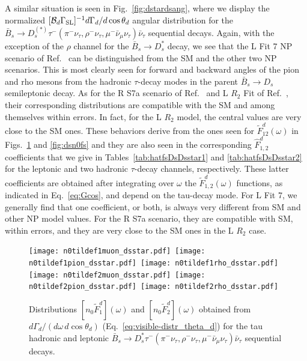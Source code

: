 \documentclass[aps,superscriptaddress,showpacs,nofootinbib,11pt]{revtex4-1}
\begin{document}
A similar situation is seen in Fig.~\ref{fig:dstardsang}, where we display the normalized $[{\cal B}_d\Gamma_{\rm SL}]^{-1}d\Gamma_d/d\cos\theta_d$ angular distribution for the 
$\bar B_s\to D_s^{(*)}\tau^-(\pi^-\nu_\tau,\rho^-\nu_\tau,\mu^-\bar\nu_\mu\nu_\tau)\bar\nu_\tau$ sequential decays. Again, with the exception of the $\rho$ channel for the $
\bar B_s\to D_s^*$ decay, we see that the  L Fit 7 NP scenario of Ref.~\cite{Murgui:2019czp} can be distinguished from the SM and the other two NP scenarios. This is most clearly seen for forward and backward angles of the pion and rho mesons from the hadronic $\tau$-decay modes in the 
parent $\bar B_s\to D_s$ semileptonic decay. As for the R S7a scenario of Ref.~\cite{Mandal:2020htr} and L $R_2$ Fit of
Ref.~\cite{Shi:2019gxi}, their corresponding distributions are compatible with the SM and among themselves within errors. In fact, for the L $R_2$ model, the central values are very close to the SM ones. 
These behaviors derive from the ones seen for $\widetilde F^d_{12}(\omega)$ in Figs.~\ref{fig:dsstardsn0fs} and \ref{fig:dsn0fs} and they are also seen in  
the corresponding $\widehat F^d_{1,2}$ coefficients  that we give in Tables~\ref{tab:hatfsDsDsstar1} and \ref{tab:hatfsDsDsstar2} for the leptonic and two hadronic $\tau$-decay channels, respectively. These latter coefficients are obtained after integrating over $\omega$ the $\widetilde F^d_{1,2}(\omega)$ functions, as indicated in Eq.~\eqref{eq:Gcos}, and depend on the tau-decay mode.
For L Fit 7, we generally find that one coefficient, or both, is always very different from SM and other NP model values. For the R S7a scenario, they are compatible with SM, within errors, and  they are very close to the SM ones in the L $R_2$ case.
\begin{figure}
\begin{center}
\texttt{[image: n0tildef1muon\_dsstar.pdf]}\
\texttt{[image: n0tildef1pion\_dsstar.pdf]}\ 
\texttt{[image: n0tildef1rho\_dsstar.pdf]}\\
\texttt{[image: n0tildef2muon\_dsstar.pdf]}\
\texttt{[image: n0tildef2pion\_dsstar.pdf]}\ 
\texttt{[image: n0tildef2rho\_dsstar.pdf]}
\caption{ Distributions $[n_0\widetilde F_1^d](\omega)$ and $[n_0\widetilde F_2^d](\omega)$  obtained from $d\Gamma_d/(d\omega\, d\cos\theta_d)$ (Eq.~\eqref{eq:visible-distr_theta_d}) for the tau hadronic and leptonic $\bar B_s\to D^*_s\tau^-(\pi^-\nu_\tau,\rho^-\nu_\tau,\mu^-\bar\nu_\mu\nu_\tau)\bar\nu_\tau$ sequential decays. }
\label{fig:dsstardsn0fs} 
\end{center}
\end{figure}
\end{document}
